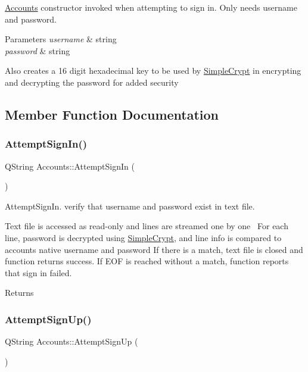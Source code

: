 \hyperlink{classAccounts}{Accounts} constructor invoked when attempting to sign in. Only needs username and password. 


\begin{DoxyParams}{Parameters}
{\em username} & string \\
\hline
{\em password} & string\\
\hline
\end{DoxyParams}
Also creates a 16 digit hexadecimal key to be used by \hyperlink{classSimpleCrypt}{Simple\+Crypt} in encrypting and decrypting the password for added security 

\subsection{Member Function Documentation}
\mbox{\label{classAccounts_a94aa6f557c36a7ca958780cfeacdec83}} 
\subsubsection{\texorpdfstring{Attempt\+Sign\+In()}{AttemptSignIn()}}
{\footnotesize\ttfamily Q\+String Accounts\+::\+Attempt\+Sign\+In (\begin{DoxyParamCaption}{ }\end{DoxyParamCaption})}



Attempt\+Sign\+In. verify that username and password exist in text file. 

Text file is accessed as read-\/only and lines are streamed one by one~\newline
For each line, password is decrypted using \hyperlink{classSimpleCrypt}{Simple\+Crypt}, and line info is compared to account\textquotesingle{}s native username and password If there is a match, text file is closed and function returns success. If E\+OF is reached without a match, function reports that sign in failed. \begin{DoxyReturn}{Returns}

\end{DoxyReturn}
\mbox{\label{classAccounts_a726265a4bb4639f6f8cb95bd17e22b36}} 
\subsubsection{\texorpdfstring{Attempt\+Sign\+Up()}{AttemptSignUp()}}
{\footnotesize\ttfamily Q\+String Accounts\+::\+Attempt\+Sign\+Up (\begin{DoxyParamCaption}{ }\end{DoxyParamCaption})}



